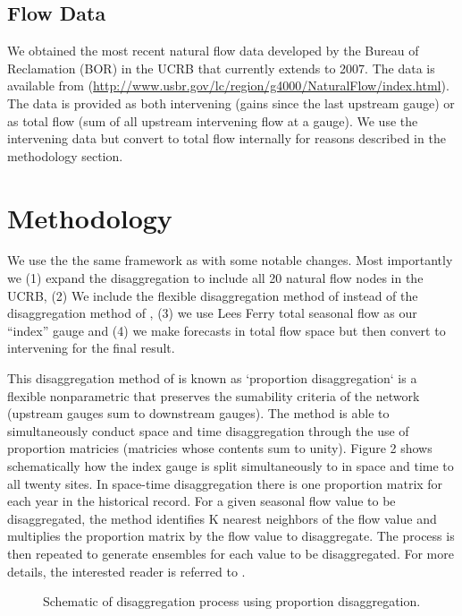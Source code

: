 \documentclass[final,5p,times,twocolumn,authoryear]{elsarticle}
\begin{document}
\subsection{Flow Data}
We obtained the most recent natural flow data developed by the Bureau of Reclamation (BOR) in the UCRB that currently extends to 2007. The data is available from (\url{http://www.usbr.gov/lc/region/g4000/NaturalFlow/index.html}).  The data is provided as both intervening (gains since the last upstream gauge) or as total flow (sum of all upstream intervening flow at a gauge).  We use the intervening data but convert to total flow internally for reasons described in the methodology section. 


\section{Methodology}

We use the the same framework as \cite{Bracken:2010cw} with some notable changes. Most importantly we (1) expand the disaggregation to include all 20 natural flow nodes in the UCRB, (2) We include the flexible disaggregation method of \cite{Nowak:2010ha} instead of the disaggregation method of \cite{Prairie:2007jf}, (3) we use Lees Ferry total seasonal flow as our ``index'' gauge and (4) we make forecasts in total flow space but then convert to intervening for the final result. 

This disaggregation method of \cite{Nowak:2010ha} is known as ‘proportion disaggregation‘ is a flexible nonparametric that preserves the sumability criteria of the network (upstream gauges sum to downstream gauges). The method is able to simultaneously conduct space and time disaggregation through the use of proportion matricies (matricies whose contents sum to unity). Figure 2 shows schematically how the index gauge is split simultaneously to in space and time to all twenty sites. In space-time disaggregation there is one proportion matrix for each year in the historical record.  For a given seasonal flow value to be disaggregated, the method identifies K nearest neighbors of the flow value and multiplies the proportion matrix by the flow value to disaggregate. The process is then repeated to generate ensembles for each value to be disaggregated. For more details, the interested reader is referred to \cite{Nowak:2010ha}.

\begin{figure}[htbp] %
   \centering
   
   \caption{Schematic of disaggregation process using proportion disaggregation.}
   \label{fig:disag}
\end{figure}
\end{document}
